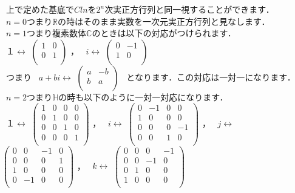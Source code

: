 \documentclass{jreport}
\theoremstyle{idefinition}
\begin{document}
\ 上で定めた基底で$Cln$を$2^n$次実正方行列と同一視することができます．\\
\ $n=0$つまり$\mathbb{R}$の時はそのまま実数を一次元実正方行列と見なします．\\
\ $n=1$つまり複素数体$\mathbb{C}$のときは以下の対応がつけられます．\\

\ $１\leftrightarrow $
$ \begin{pmatrix}
 1 & 0 \\
 0 & 1 \\
\end{pmatrix}  $ ，
\ $i \leftrightarrow $
$ \begin{pmatrix}
 0 & -1 \\
 1 & 0 \\
\end{pmatrix}  $\\
\ つまり
\ $a+bi\leftrightarrow $
$ \begin{pmatrix}
 a & -b \\
 b & a \\
\end{pmatrix}  $
\ となります．この対応は一対一になります．\\

\ $n=2$つまり$\mathbb{H}$の時も以下のように一対一対応になります．\\

\ $１\leftrightarrow $
$ \begin{pmatrix}
 1 & 0 & 0 & 0 \\
 0 & 1 & 0 & 0 \\
 0 & 0 & 1 & 0 \\
 0 & 0 & 0 & 1 \\
\end{pmatrix}  $ ，
\ $i \leftrightarrow $
$ \begin{pmatrix}
 0 & -1 & 0 & 0 \\
 1 & 0 & 0 & 0 \\
 0 & 0 & 0 & -1 \\
 0 & 0 & 1 & 0 \\
\end{pmatrix}  $ ，
\ $j \leftrightarrow $
$ \begin{pmatrix}
 0 & 0 & -1 & 0 \\
 0 & 0 & 0 & 1 \\
 1 & 0 & 0 & 0 \\
 0 & -1 & 0 & 0 \\
\end{pmatrix}  $ ，
\ $k \leftrightarrow $
$ \begin{pmatrix}
 0 & 0 & 0 & -1 \\
 0 & 0 & -1 & 0 \\
 0 & 1 & 0 & 0 \\
 1 & 0 & 0 & 0 \\
\end{pmatrix}  $ \\\\\\\\
\end{document}
